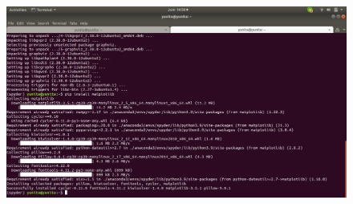 \begin{enumerate}
\begin{figure}[!htbp]
		\includegraphics[scale=0.4]{figures/chapter2/erorketikatidakadamodulmatplolib.png}
	\end{figure}

\end{enumerate}

